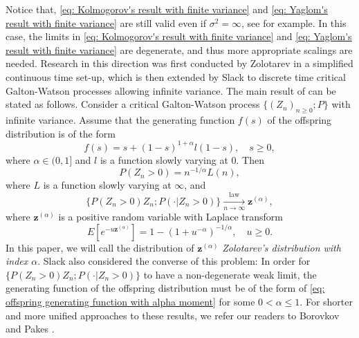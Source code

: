 \documentclass[12pt, a4paper]{amsart}
\theoremstyle{definition}
\numberwithin{equation}{section}
\begin{document}
	Notice that, \eqref{eq: Kolmogorov's result with finite variance} and \eqref{eq: Yaglom's result with finite variance} are still valid even if  $\sigma^2 = \infty$,  see \cite{KestenNeySpitzer1966The-Galton-Watson} for example.
    In this case, the limits in \eqref{eq: Kolmogorov's result with finite variance} and \eqref{eq: Yaglom's result with finite variance} are degenerate, and thus more appropriate scalings are needed.
	Research in this direction was first conducted by Zolotarev \cite{Zolotarev1957More} in a simplified continuous time set-up, which is then extended by Slack \cite{Slack1968A-branching} to discrete time critical Galton-Watson processes allowing infinite variance. 
	The main result of  \cite{Slack1968A-branching} can be stated as follows. Consider a critical Galton-Watson process $\{(Z_n)_{n\geq 0}; P\}$
	with infinite variance.
	Assume that the  generating function $f(s)$ of the offspring distribution is of the form
\begin{equation}\label{eq: offspring generating function with alpha moment}
	f(s)
	= s + (1-s)^{1+ \alpha} l(1-s),
	\quad s\geq 0,
\end{equation}
	where $\alpha\in (0, 1]$ and $l$ is a function slowly varying at $0$.
	Then
\begin{equation} \label{eq: extinction probability of critical GW process without 2rd moment}
	P(Z_n > 0) 
	= n^{-1/\alpha} L(n),
\end{equation}
	where $L$ is a function slowly varying at $\infty$, and
\begin{equation} \label{eq: conditional distribution of critical GW process without 2rd moment}
	\big\{ P(Z_n > 0) Z_n; P(\cdot | Z_n > 0)\big\}
	\xrightarrow[n\to \infty]{\operatorname{law}} \mathbf z^{(\alpha)},
\end{equation}
	where $\mathbf z^{(\alpha)}$ is a positive random variable with Laplace transform
\begin{equation}
	E[e^{- u \mathbf z^{(\alpha)}}]
	= 1 - (1+ u^{-\alpha})^{-1/\alpha},
	\quad u \geq 0.
\end{equation}
	In this paper, we will call the distribution of $\mathbf z^{(\alpha)}$ \emph{Zolotarev's distribution with index $\alpha$}.
	Slack \cite{Slack1972Further} also considered the converse of this problem:
	In order for $\big\{ P(Z_n > 0) Z_n; P(\cdot | Z_n > 0)\big\}$ to have
	a non-degenerate weak limit, 
    the generating function of the offspring distribution must be of  
	the form of \eqref{eq: offspring generating function with alpha moment} for some $0 < \alpha \leq 1$.
	For shorter and more unified approaches to these results, we refer our readers to Borovkov \cite{Borovkov1989Method} and Pakes \cite{Pakes2010Critical}.
\end{document}
